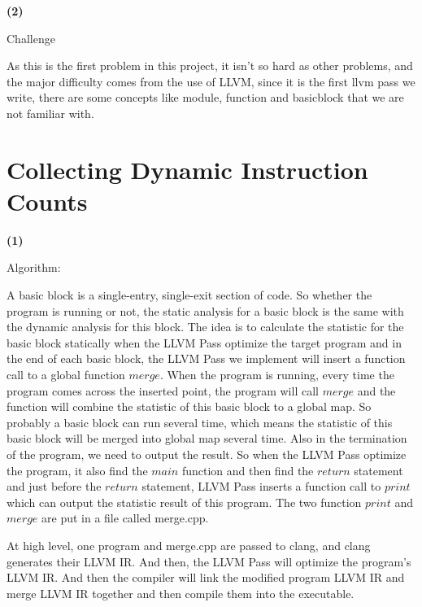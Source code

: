\documentclass{article}
\renewcommand{\part}[1] {\vspace{.10in} {\bf (#1)}}
\begin{document}
\part{2}

Challenge
	

As this is the first problem in this project, it isn't so hard as other problems, and the major difficulty comes from the use of LLVM, since it is the first llvm pass we write, there are some concepts like module, function and basicblock that we are not familiar with.




\section{Collecting Dynamic Instruction Counts}

\part{1}

Algorithm:

A basic block is a single-entry, single-exit section of code. So whether the program is running or not, the static analysis for a basic block is the same with the dynamic analysis for this block. The idea is to calculate the statistic for the basic block statically when the LLVM Pass optimize the target program and in the end of each basic block, the LLVM Pass we implement will insert a function call to a global function $merge$. When the program is running, every time the program comes across the inserted point, the program will call $merge$ and the function will combine the statistic of this basic block to a global map. So probably a basic block can run several time, which means the statistic of this basic block will be merged into global map several time. Also in the termination of the program, we need to output the result. So when the LLVM Pass optimize the program, it also find the $main$ function and then find the $return$ statement and just before the $return$ statement, LLVM Pass inserts a function call to $print$ which can output the statistic result of this program. The two function $print$ and $merge$ are put in a file called merge.cpp.

At high level, one program and merge.cpp are passed to clang, and clang generates their LLVM IR. And then, the LLVM Pass will optimize the {program's} LLVM IR. And then the compiler will link the modified program LLVM IR and merge LLVM IR together and then compile them into the executable.
\end{document}

